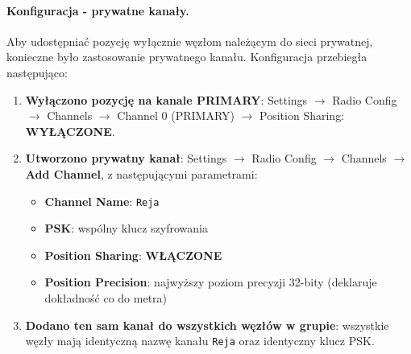 \paragraph{Konfiguracja - prywatne kanały.}

Aby udostępniać pozycję wyłącznie węzłom należącym do sieci prywatnej, konieczne było zastosowanie
prywatnego kanału. Konfiguracja przebiegła następująco:

\begin{enumerate}
    \item \textbf{Wyłączono pozycję na kanale PRIMARY}:
          Settings $\rightarrow$ Radio Config $\rightarrow$ Channels $\rightarrow$ Channel 0 (PRIMARY)
          $\rightarrow$ Position Sharing: \textbf{WYŁĄCZONE}.

    \item \textbf{Utworzono prywatny kanał}:
          Settings $\rightarrow$ Radio Config $\rightarrow$ Channels $\rightarrow$ \textbf{Add Channel},
          z następującymi parametrami:
          \begin{itemize}
              \item \textbf{Channel Name}: \texttt{Reja}
              \item \textbf{PSK}: wspólny klucz szyfrowania
              \item \textbf{Position Sharing}: \textbf{WŁĄCZONE}
              \item \textbf{Position Precision}: najwyższy poziom precyzji 32-bity
                    (deklaruje dokładność co do metra)
          \end{itemize}

    \item \textbf{Dodano ten sam kanał do wszystkich węzłów w grupie}: wszystkie węzły mają
          identyczną nazwę kanału \texttt{Reja} oraz identyczny klucz PSK.
\end{enumerate}



